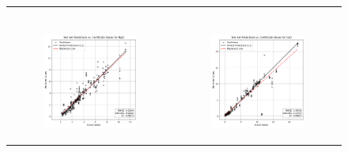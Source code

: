 \begin{figure}
{\begin{tabular}{cc}
\begin{subfigure}{0.5\textwidth}
            \end{subfigure} \\
            \begin{subfigure}{0.5\textwidth}
                \includegraphics[width=\textwidth]{images/one_to_one/svr/MgO.png}
            \end{subfigure} & \hspace{3cm}
            \begin{subfigure}{0.5\textwidth}
                \includegraphics[width=\textwidth]{images/one_to_one/svr/CaO.png}

\end{subfigure}
\end{tabular}}
\end{figure}
